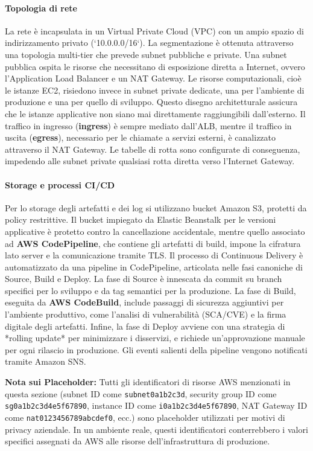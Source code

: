 \paragraph{Topologia di rete}
La rete è incapsulata in un Virtual Private Cloud (VPC) con un ampio spazio di indirizzamento privato (`10.0.0.0/16`). La segmentazione è ottenuta attraverso una topologia multi-tier che prevede subnet pubbliche e private. Una subnet pubblica ospita le risorse che necessitano di esposizione diretta a Internet, ovvero l'Application Load Balancer e un NAT Gateway. Le risorse computazionali, cioè le istanze EC2, risiedono invece in subnet private dedicate, una per l'ambiente di produzione e una per quello di sviluppo. Questo disegno architetturale assicura che le istanze applicative non siano mai direttamente raggiungibili dall'esterno. Il traffico in ingresso (\textbf{ingress}) è sempre mediato dall'ALB, mentre il traffico in uscita (\textbf{egress}), necessario per le chiamate a servizi esterni, è canalizzato attraverso il NAT Gateway. Le tabelle di rotta sono configurate di conseguenza, impedendo alle subnet private qualsiasi rotta diretta verso l'Internet Gateway.

\paragraph{Storage e processi CI/CD}
Per lo storage degli artefatti e dei log si utilizzano bucket Amazon S3, protetti da policy restrittive. Il bucket impiegato da Elastic Beanstalk per le versioni applicative è protetto contro la cancellazione accidentale, mentre quello associato ad \textbf{AWS CodePipeline}, che contiene gli artefatti di build, impone la cifratura lato server e la comunicazione tramite TLS. Il processo di Continuous Delivery è automatizzato da una pipeline in CodePipeline, articolata nelle fasi canoniche di Source, Build e Deploy. La fase di Source è innescata da commit su branch specifici per lo sviluppo e da tag semantici per la produzione. La fase di Build, eseguita da \textbf{AWS CodeBuild}, include passaggi di sicurezza aggiuntivi per l'ambiente produttivo, come l'analisi di vulnerabilità (SCA/CVE) e la firma digitale degli artefatti. Infine, la fase di Deploy avviene con una strategia di *rolling update* per minimizzare i disservizi, e richiede un'approvazione manuale per ogni rilascio in produzione. Gli eventi salienti della pipeline vengono notificati tramite Amazon SNS.

\textbf{Nota sui Placeholder:} Tutti gli identificatori di risorse AWS menzionati in questa sezione (subnet ID come \texttt{subnet\discretionary{-}{}{-}0a1b2c3d}, security group ID come \texttt{sg\discretionary{-}{}{-}0a1b2c3d4e5f67890}, instance ID come \texttt{i\discretionary{-}{}{-}0a1b2c3d4e5f67890}, NAT Gateway ID come \texttt{nat\discretionary{-}{}{-}0123456789abcdef0}, ecc.) sono placeholder utilizzati per motivi di privacy aziendale. In un ambiente reale, questi identificatori conterrebbero i valori specifici assegnati da AWS alle risorse dell'infrastruttura di produzione.

